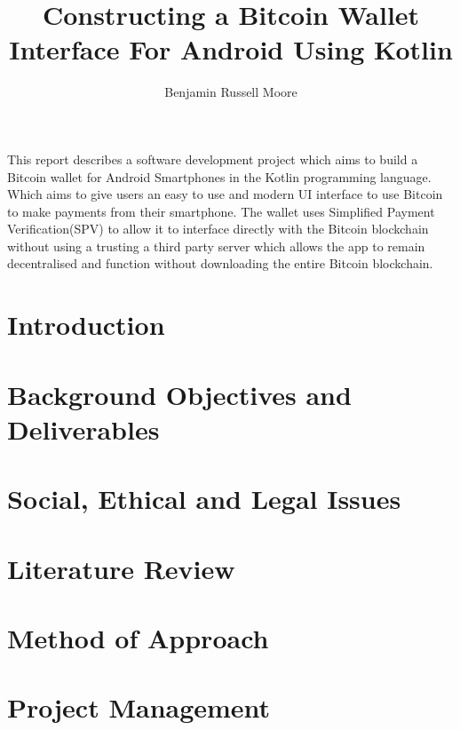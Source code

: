 \documentclass{article}
\title{Constructing a Bitcoin Wallet Interface For Android Using Kotlin}
\author{Benjamin Russell Moore}
\date{ }
\begin{document}
\maketitle

\newpage

\tableofcontents

\newpage


This report describes a software development project which aims to build a Bitcoin wallet for Android Smartphones in the Kotlin programming language.
Which aims to give users an easy to use and modern UI interface to use Bitcoin to make payments from their smartphone.
The wallet uses Simplified Payment Verification(SPV) to allow it to interface directly with the Bitcoin blockchain without using a trusting a third party server which allows the app to remain decentralised and function without downloading the entire Bitcoin blockchain.  

\section{Introduction}

\section{Background Objectives and Deliverables}

\section{Social, Ethical and Legal Issues}

\section{Literature Review}


\section{Method of Approach}

\section{Project Management}
\end{document}
